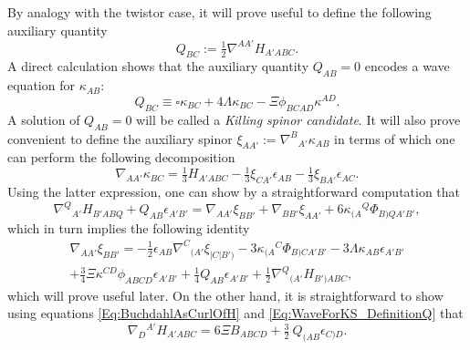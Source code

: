\documentclass[10pt,a4paper]{article}
\theoremstyle{plain}
\begin{document}
By analogy with the twistor case, it will prove useful to define the
following auxiliary quantity
\begin{equation}
  Q_{BC} := \tfrac{1}{2}\nabla^{AA'}H_{A'ABC}.
 \label{Eq:WaveForKS_DefinitionQ}
\end{equation}
A direct calculation shows that the auxiliary quantity $Q_{AB}=0$
encodes a wave equation for $\kappa_{AB}$:
\begin{equation}
  Q_{BC} \equiv \square \kappa_{BC} + 4 \Lambda\kappa_{BC} - \Xi
  \phi_{BCAD}\kappa^{AD}.
  \label{Eq:WaveForKS}
\end{equation}
A solution of $Q_{AB}=0$ will be called a \emph{Killing spinor candidate}. It will also prove convenient to define the
auxiliary spinor $\xi_{AA'} := \nabla^{B}{}_{A'}\kappa_{AB}$ in terms
of which one can perform the following decomposition
\begin{equation}
\nabla_{AA'}\kappa_{BC} = \tfrac{1}{3} H_{A'ABC} - \tfrac{1}{3}
\xi_{CA'} \epsilon_{AB} - \tfrac{1}{3} \xi_{BA'}
\epsilon_{AC}.\label{Eq:DecompGradKS}
\end{equation}
Using the latter expression, one can show by a straightforward
computation that
\begin{equation}\label{eq:non-KillingVectorExplained}
  \nabla^Q{}_{A'}H_{B'ABQ} + Q_{AB} \epsilon_{A'B'} =
  \nabla_{AA'}\xi_{BB'} + \nabla_{BB'}\xi_{AA'} + 6 \kappa_{(A}{}^{Q}
  \Phi_{B)QA'B'},
\end{equation}
which in turn implies the following identity
\begin{multline}
\nabla_{AA'}\xi_{BB'} = - \tfrac{1}{2} \epsilon_{AB}
\nabla^{C}{}_{(A'}\xi_{|C|B')}- 3 \kappa_{(A}{}^{C} \Phi_{B)CA'B'} - 3
\Lambda \kappa_{AB} \epsilon_{A'B'} \\+ \tfrac{3}{4} \Xi \kappa^{CD}
\phi_{ABCD} \epsilon_{A'B'} + \tfrac{1}{4} Q_{AB} \epsilon_{A'B'} +
\tfrac{1}{2} \nabla^Q{}_{(A'}H_{B')ABC},\label{Eq:DecompGradXi}
\end{multline}
which will prove useful later. On the other hand, it is
straightforward to show using equations \eqref{Eq:BuchdahlAsCurlOfH}
and \eqref{Eq:WaveForKS_DefinitionQ} that
\begin{equation}
     \nabla_{D}{}^{A'}H_{A'ABC} = 6 \Xi B_{ABCD} + \tfrac{3}{2}
     \ Q_{(AB}\epsilon_{C)D}.\label{IrrDecompCurlOfH}
\end{equation}
\end{document}
